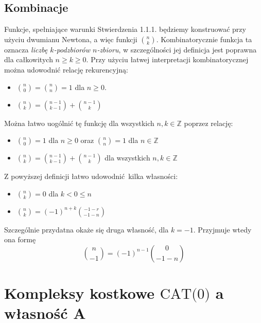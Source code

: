 \documentclass[licencjacka]{pracamgr}
\theoremstyle{definition}
\theoremstyle{definition}
\theoremstyle{definition}
\theoremstyle{definition}
\theoremstyle{definition}
\theoremstyle{plain}
\theoremstyle{plain}
\begin{document}
\section{Kombinacje}
Funkcje, spełniające warunki Stwierdzenia 1.1.1. będziemy konstruować przy 
użyciu dwumianu Newtona, a więc funkcji $ {n \choose k} $. Kombinatorycznie funkcja ta 
oznacza \textit{liczbę $ k $-podzbiorów $ n $-zbioru}, w szczególności jej definicja jest 
poprawna dla całkowitych $ n \geq k \geq 0 $. Przy użyciu łatwej interpretacji 
kombinatorycznej można udowodnić relację rekurencyjną:

\begin{itemize}
	\item $ {n \choose 0} = {n \choose n} = 1 $ dla $ n \geq 0 $.
	\item $ {n \choose k} = {n-1 \choose k-1} + {n-1 \choose k} $
\end{itemize}

Można łatwo uogólnić tę funkcję dla wszystkich $ n,k \in \mathbb{Z} $ poprzez relację:

\begin{itemize}
	\item $ {n \choose 0} = 1  $ dla $ n \geq 0$ oraz $ {n \choose n} = 1  $ dla 
	$ n \in \mathbb{Z}$
	\item $ {n \choose k} = {n -1 \choose k-1} + {n-1 \choose k} $ dla wszystkich $ n,k \in
	\mathbb{Z} $
\end{itemize}

Z powyższej definicji łatwo udowodnić kilka własności:

\begin{itemize}
	\item ${n \choose k} = 0$ dla $ k < 0 \leq n $
	\item $ {n \choose k} = (-1)^{n+k}{-1-r \choose -1-n} $
\end{itemize}

Szczególnie przydatna okaże się druga własność, dla $ k = -1 $. Przyjmuje wtedy ona formę 
$$ {n \choose -1} = (-1)^{n-1} {0 \choose -1-n} $$

\chapter{Kompleksy kostkowe $ \text{CAT(0)} $ a własność A}
\end{document}
